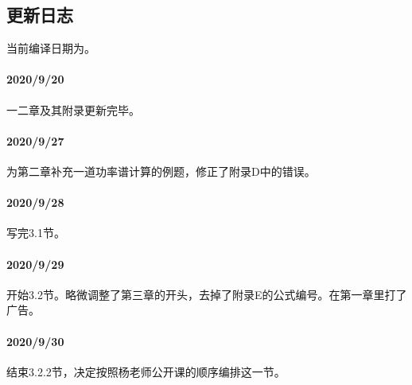 \subsection{更新日志}
    当前编译日期为。
    \paragraph{2020/9/20}一二章及其附录更新完毕。
    \paragraph{2020/9/27}为第二章补充一道功率谱计算的例题，修正了附录D中的错误。
    \paragraph{2020/9/28}写完3.1节。
    \paragraph{2020/9/29}开始3.2节。略微调整了第三章的开头，去掉了附录E的公式编号。在第一章里打了广告。
    \paragraph{2020/9/30}结束3.2.2节，决定按照杨老师公开课的顺序编排这一节。